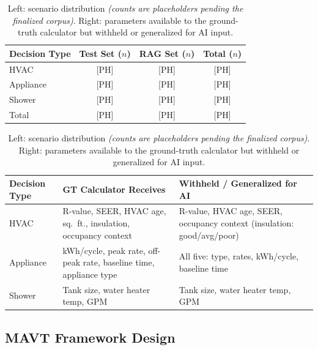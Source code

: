 \documentclass[final,3p,times]{elsarticle}
\begin{document}
\begin{table}[t]
\footnotesize
\centering
\begin{minipage}[t]{0.34\textwidth}
\centering
\renewcommand{\arraystretch}{1.15}
\begin{tabular}{lccc}
\toprule
Decision Type & Test Set ($n$) & RAG Set ($n$) & Total ($n$) \\
\midrule
HVAC      & [PH] & [PH] & [PH] \\
Appliance & [PH] & [PH] & [PH] \\
Shower    & [PH] & [PH] & [PH] \\
\midrule
Total     & [PH] & [PH] & [PH] \\
\bottomrule
\end{tabular}
\renewcommand{\arraystretch}{1.0}
\end{minipage}
\hspace{2em}
\begin{minipage}[t]{0.60\textwidth}
\centering
\renewcommand{\arraystretch}{1.15}
\begin{tabular}{lll}
\toprule
Decision Type & GT Calculator Receives & Withheld / Generalized for AI \\
\midrule
HVAC & \parbox[t]{0.26\textwidth}{R-value, SEER, HVAC age, sq.\ ft., insulation, occupancy context} & \parbox[t]{0.26\textwidth}{R-value, HVAC age, SEER, occupancy context (insulation: good/avg/poor)} \\
Appliance & \parbox[t]{0.26\textwidth}{kWh/cycle, peak rate, off-peak rate, baseline time, appliance type} & \parbox[t]{0.26\textwidth}{All five: type, rates, kWh/cycle, baseline time} \\
Shower & \parbox[t]{0.26\textwidth}{Tank size, water heater temp, GPM} & \parbox[t]{0.26\textwidth}{Tank size, water heater temp, GPM} \\
\bottomrule
\end{tabular}
\renewcommand{\arraystretch}{1.0}
\end{minipage}
\caption{Left: scenario distribution \textit{(counts are placeholders pending the finalized corpus)}. Right: parameters available to the ground-truth calculator but withheld or generalized for AI input.}
\label{tab:scenario-distribution}
\end{table}

\subsection{MAVT Framework Design}
\label{sec:mavt-design}
\end{document}
